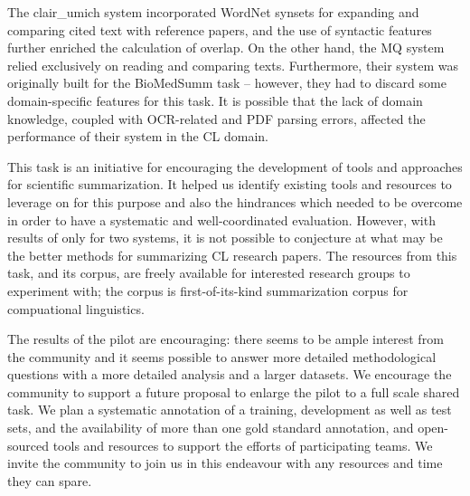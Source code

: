 \documentclass[11pt]{article}
\begin{document}
The clair\_umich system incorporated WordNet synsets for expanding and 
comparing cited text with reference papers, and the use of syntactic features 
further enriched the calculation of overlap. On the other hand, the MQ system 
relied exclusively on reading and comparing texts. Furthermore, their system 
was originally built for the BioMedSumm task -- however, they had to discard 
some domain-specific features for this task. It is possible that the lack of 
domain knowledge, coupled with OCR-related and PDF parsing errors, affected 
the performance of their system in the CL domain.

This task is an initiative for encouraging the development of tools and 
approaches for scientific summarization. It helped us identify 
existing tools and resources to leverage on for this purpose
and also the hindrances which needed to be overcome in order to have a 
systematic and well-coordinated evaluation. However, with results of 
only for two systems, it is not possible to conjecture at what may be the 
better methods for summarizing CL research papers. The 
resources from this task, and its corpus, are freely available 
for interested research groups to experiment with; the corpus is 
first-of-its-kind summarization corpus for compuational linguistics.

The results of the pilot are encouraging: there seems to be ample
interest from the community and it seems possible to answer more
detailed methodological questions with a more detailed analysis and a
larger datasets.  We encourage the community to support a future
proposal to enlarge the pilot to a full scale shared task.  We plan a
systematic annotation of a training, development as well as test sets,
and the availability of more than one gold standard annotation, and
open-sourced tools and resources to support the efforts of
participating teams. We invite the community to join us in this
endeavour with any resources and time they can spare.


\end{document}
